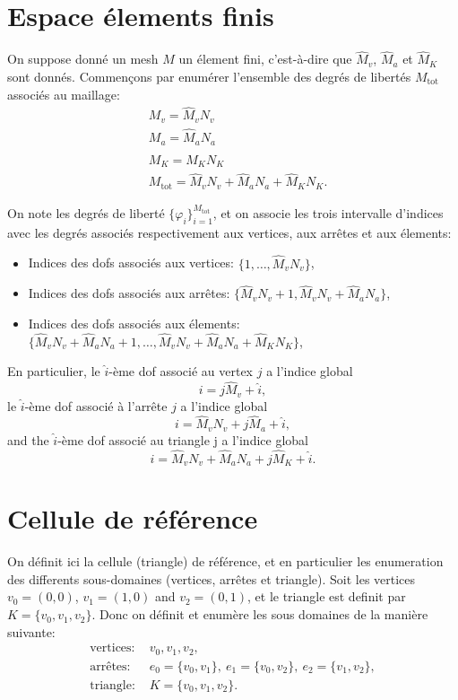 \section{Espace \'elements finis}
On suppose donn\'e un mesh $M$ un \'element fini, c'est-\`a-dire que
$\hat M_v$, $\hat M_a$ et $\hat M_K$ sont donn\'es. Commen\c cons par
enum\'erer l'ensemble des degr\'es de libert\'es $M_\text{tot}$
associ\'es au maillage: 
\begin{align}
  & M_v = \hat M_v N_v\\
  & M_a = \hat M_a N_a\\
  & M_K = \hat M_K N_K\\
  & M_\text{tot} = \hat M_v N_v + \hat M_a N_a + \hat M_K N_K.
\end{align}

On note les degr\'es de libert\'e $\{\varphi_i\}_{i=1}^{M_\text{tot}}$,
et on associe les trois intervalle d'indices avec les degr\'es
associ\'es respectivement aux vertices, aux arr\^etes et aux
\'elements: 

\begin{itemize}
\item Indices des dofs associ\'es aux vertices: $\{1, \dots, \hat M_v
  N_v\}$,
\item Indices des dofs associ\'es aux arr\^etes: $\{\hat M_v N_v + 1,
  \hat M_v N_v + \hat M_a N_a\}$,
\item Indices des dofs associ\'es aux \'elements: $\{\hat M_v N_v + \hat
  M_a N_a + 1, \dots, \hat M_v N_v + \hat M_a N_a + \hat M_K N_K\}$,
\end{itemize}

En particulier, le $\hat i$-\`eme dof associ\'e au vertex $j$ a l'indice global 
\begin{equation}
  i = j \hat M_v + \hat i,
\end{equation}
le $\hat i$-\`eme dof associ\'e \`a l'arr\^ete $j$ a l'indice global 
\begin{equation}
  i = \hat M_v N_v + j \hat M_a + \hat i,
\end{equation}
and the $\hat i$-\`eme dof associ\'e au triangle j a l'indice global 
\begin{equation}
  i = \hat M_v N_v + \hat M_a N_a + j \hat M_K + \hat i.
\end{equation}

\section{Cellule de r\'ef\'erence}
On d\'efinit ici la cellule (triangle) de r\'ef\'erence, et en
particulier les enumeration des differents sous-domaines (vertices,
arr\^etes et triangle). Soit les vertices $v_0 = (0,0)$, $v_1 =
(1,0)$ and $v_2 = (0,1)$, et le triangle est definit par $K = \{v_0,
v_1, v_2\}$. Donc on d\'efinit et enum\`ere les sous domaines de la
mani\`ere suivante: 
\begin{align*}
  \text{vertices: } & v_0, v_1, v_2,\\
  \text{arr\^etes: } & e_0 = \{v_0, v_1\},\ e_1 = \{v_0, v_2\},\ e_2 =
  \{v_1, v_2\}, \\
  \text{triangle: } & K = \{v_0, v_1, v_2\}.
\end{align*}

